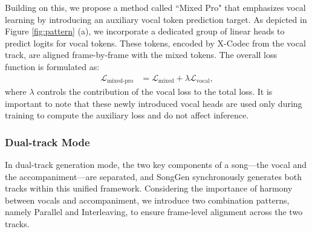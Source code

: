 Building on this, we propose a method called ``Mixed Pro" that emphasizes vocal learning by introducing an auxiliary vocal token prediction target. 
As depicted in Figure \ref{fig:pattern} (a), we incorporate a dedicated group of linear heads to predict logits for vocal tokens. These tokens, encoded by X-Codec from the vocal track, are aligned frame-by-frame with the mixed tokens. 
The overall loss function is formulated as:
\begin{equation}
\begin{aligned} 
\mathcal{L}_{\text{mixed-pro}} &=  \mathcal{L}_{\text{mixed}} + \lambda \mathcal{L}_{\text{vocal}},
\end{aligned}    
\end{equation}
where $\lambda$  controls the contribution of the vocal loss to the total loss.
It is important to note that these newly introduced vocal heads are used only during training to compute the auxiliary loss and do not affect inference.


 
 


\subsubsection{Dual-track Mode}

In dual-track generation mode, the two key components of a song—the vocal and the accompaniment—are separated, and SongGen synchronously generates both tracks within this unified framework.
Considering the importance of harmony between vocals and accompaniment, we introduce two combination patterns, namely Parallel and Interleaving, to ensure frame-level alignment across the two tracks.


